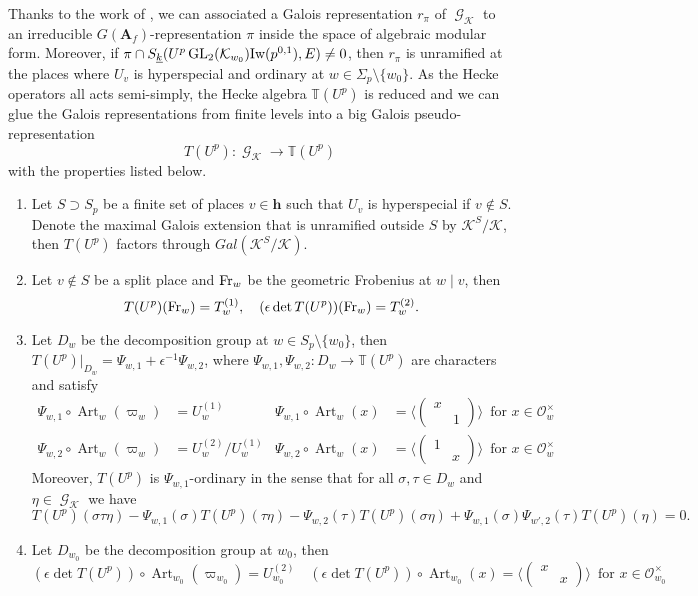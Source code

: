\documentclass[leqno]{amsart}
\theoremstyle{definition}
\theoremstyle{remark}
\newcommand{\oo}{\mathcal{O}}
\newcommand{\A}{\mathbf A}
\newcommand{\finite}{\mathbf{h}}
\DeclareMathOperator{\GL}{GL}
\DeclareMathOperator{\Gal}{\mathcal{G}}
\DeclareMathOperator{\Art}{Art}
\newcommand{\Fr}{\textnormal{Fr}} %
\newcommand{\K}{{\mathcal{K}}} %
\newcommand{\wt}[1]{\underline{ #1 }}
\newcommand{\Iw}{\textnormal{Iw}} %
\newcommand{\TT}{\mathbb{T}} %
\begin{document}
Thanks to the work of \cite{ger},
we can associated a Galois representation $r_\pi$ of $\Gal_\K$
to an irreducible $G(\A_f)$-representation $\pi$
inside the space of algebraic modular form.
Moreover, if $\pi\cap S_{\wt{k}}(U^p\GL_2(\K_{w_0})\Iw(p^{0,1}),E)\neq 0$,
then $r_\pi$ is unramified at the places where 
$U_v$ is hyperspecial and ordinary at $w\in \Sigma_p\setminus\{w_0\}$.
As the Hecke operators all acts semi-simply,
the Hecke algebra $\TT(U^p)$ is reduced 
and we can glue the Galois representations from 
finite levels into a big Galois pseudo-representation
\[
    T(U^p)\colon \Gal_\K\to \TT(U^p)
\]
with the properties listed below.
\begin{enumerate}
    \item Let $S\supset S_p$ be a finite set of places $v\in\finite$
    such that $U_v$ is hyperspecial if $v\notin S$.
    Denote the maximal Galois extension
    that is unramified outside $S$ by $\K^S/\K$, then
    $T(U^p)$ factors through $Gal(\K^S/\K)$.
    \item Let $v\notin S$ be a split place
    and $\Fr_w$ be the geometric Frobenius at $w\mid v$, then
    \[
        T(U^p)(\Fr_w)=T_w^{(1)},\quad
        (\epsilon \det T(U^p))(\Fr_w)=T_w^{(2)}.
    \]
    \item Let $D_{w}$ be the decomposition group at
    $w\in S_p\setminus\{w_0\}$, then 
    $T(U^p)\vert_{D_{w}}=\Psi_{w,1}+\epsilon^{-1}\Psi_{w,2}$,
    where $\Psi_{w,1},\Psi_{w,2}\colon D_{w}\to \TT(U^p)$
    are characters and satisfy
    \begin{equation*}
	\begin{aligned}
		\Psi_{w,1}\circ \Art_{w}(\varpi_{w})&=
		U_{w}^{(1)} &
		\Psi_{w,1}\circ \Art_{w}(x)&=
		\langle 
		(\begin{smallmatrix}
			x&\\&1
		\end{smallmatrix})
		\rangle\, \text{ for }x\in \oo_{w}^{\times}\\
		\Psi_{w,2}\circ \Art_{w}(\varpi_{w})&=
		U_{w}^{(2)}/
		U_{w}^{(1)}&
		\Psi_{w,2}\circ \Art_{w}(x)&=
		\langle 
		(\begin{smallmatrix}
			1&\\&x
		\end{smallmatrix})
		\rangle\, \text{ for }x\in \oo_{w}^{\times}
	\end{aligned}
	\end{equation*}
    Moreover, $T(U^p)$ is $\Psi_{w,1}$-ordinary 
    in the sense that for all 
    $\sigma, \tau\in D_{w}$ and $\eta\in\Gal_\K$ we have
    \[
        T(U^p)(\sigma\tau\eta)
        -\Psi_{w,1}(\sigma)T(U^p)(\tau\eta)
        -\Psi_{w,2}(\tau)T(U^p)(\sigma\eta)
        +\Psi_{w,1}(\sigma)\Psi_{w',2}(\tau)T(U^p)(\eta)=0.
    \]
    \item Let $D_{w_0}$ be the decomposition group at $w_0$, then
    \[
        (\epsilon\det T(U^p))\circ \Art_{w_0}
        (\varpi_{w_0})=U_{w_0}^{(2)}\quad
        (\epsilon\det T(U^p))\circ \Art_{w_0}(x)=
        \langle 
		(\begin{smallmatrix}
			x&\\&x
		\end{smallmatrix})
		\rangle\, \text{ for }x\in \oo_{w_0}^{\times}
    \]
\end{enumerate}
\end{document}
